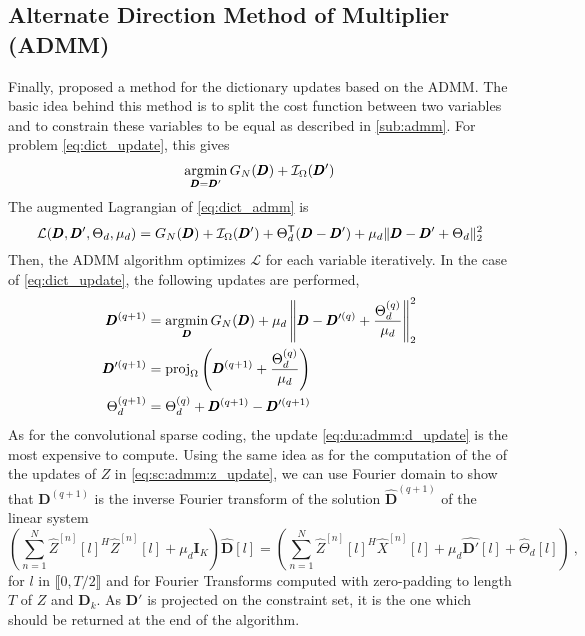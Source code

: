 \documentclass[../thesis.tex]{subfiles}
\begin{document}
\subsection{Alternate Direction Method of Multiplier (ADMM)}
\label{sub:du_admm}
	Finally, \citet{Bristow2013} proposed a method for the dictionary updates based on
	the ADMM. The basic idea behind this method is to split the cost function between two
	variables and to constrain these variables to be equal as described in \autoref{sub:admm}.
	For problem \autoref{eq:dict_update}, this gives
	\begin{equation}
		\label{eq:dict_admm}
		\operatorname*{\arg\!\min}_{\pmb D = \pmb D'} G_N(\pmb D) + \mathcal I_\Omega(\pmb D')
	\end{equation}
	The augmented Lagrangian of \autoref{eq:dict_admm} is 
	\[
		\mathcal L(\pmb D, \pmb D', \Theta_d, \mu_d) = G_N(\pmb D) + \mathcal I_\Omega(\pmb D')
			+ \Theta_d^\mathsf{T}(\pmb D - \pmb D') + \mu_d\|\pmb D - \pmb D' + \Theta_d\|_2^2
	\]
	Then, the ADMM algorithm optimizes $\mathcal L$ for each variable iteratively. In
	the case of \autoref{eq:dict_update}, the following updates are performed, 
	\begin{align}
		\label{eq:du:admm:d_update}
		\pmb D^{(q+1)} & = \operatorname*{\arg\!\min}_{\pmb D} G_N(\pmb D) + \mu_d\left\|\pmb D - \pmb D'^{(q)} + \frac{\Theta_d^{(q)}}{\mu_d}\right\|_2^2\\
		\label{eq:admm5}
		\pmb D'^{(q+1)} & = \text{proj}_\Omega \left( \pmb D^{(q+1)} + \frac{\Theta_d^{(q)}}{\mu_d}\right)\\
		\label{eq:admm6}
		\Theta_d^{(q+1)} & = \Theta_d^{(q)} + \pmb D^{(q+1)} - \pmb D'^{(q+1)}
	\end{align}
	As for the convolutional sparse coding, the update \autoref{eq:du:admm:d_update} is
	the most expensive to compute. Using the same idea as for the computation of the 
	of the updates of $Z$ in \autoref{eq:sc:admm:z_update}, we can use Fourier domain
	to show that $\pmb D^{(q+1)}$ is the inverse Fourier transform of the solution
	$\widehat {\pmb D}^{(q+1)}$ of the linear system
	\[
		\left(\sum_{n=1}^N \widehat Z^{[n]}[l]^H\widehat Z^{[n]}[l] + \mu_d\pmb I_K\right) \widehat {\pmb D}[l]
			= \left(\sum_{n=1}^N \widehat Z^{[n]}[l]^H\widehat X^{[n]}[l] +
					\mu_d\widehat {\pmb D'}[l] + \widehat \Theta_d[l]\right)~,
	\]
	for $l$ in $\llbracket 0, T/2 \rrbracket$ and for Fourier Transforms computed with
	zero-padding to length $T$ of $Z$ and $\pmb D_k$. As $\pmb D'$ is projected on the
	constraint set, it is the one which should be returned at the end of the algorithm.
	
\end{document}
